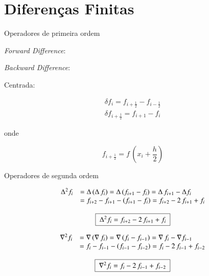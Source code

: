 \section{Diferenças Finitas}

\begin{enumerar}

\item Operadores de primeira ordem

\begin{enumerar}

\item \textit{Forward Difference}: 

\item \textit{Backward Difference}: 

\item Centrada:

\[
 \begin{array}{l}
  \delta f_i = f_{i+\frac{1}{2}} - f_{i-\frac{1}{2}} \\
  \delta f_{i+\frac{1}{2}} = f_{i+1} - f_i
 \end{array}
\]

onde

\[
 f_{i+\frac{1}{2}} = f\,\left(x_i + \frac{h}{2}\right)
\]

\end{enumerar}

\item Operadores de segunda ordem

\begin{enumerar}

\item 
\[
 \begin{array}{c}
  \begin{array}{ll}
   \Delta^2 f_i & = \Delta\,(\Delta\,f_i) = \Delta\,(f_{i+1} - f_i) = \Delta\,f_{i+1} - \Delta f_i \\
                & = f_{i+2} - f_{i+1} - (f_{i+1} - f_i) = f_{i+2} - 2\,f_{i+1} + f_i 
  \end{array} \\ \\
  \quadricular{\Delta^2 f_i = f_{i+2} - 2\,f_{i+1} + f_i}
 \end{array}
\]

\item
\[
 \begin{array}{c}
  \begin{array}{ll}
   \nabla^2 f_i & = \nabla\,(\nabla\,f_i) = \nabla\,(f_i - f_{i-1}) = \nabla\,f_i - \nabla f_{i-1} \\
                & = f_i - f_{i-1} - (f_{i-1} - f_{i-2}) = f_i - 2\,f_{i-1} + f_{i-2} 
  \end{array} \\ \\
  \quadricular{\nabla^2 f_i = f_i - 2\,f_{i-1} + f_{i-2}}
 \end{array}
\]


\end{enumerar}
\end{enumerar}

